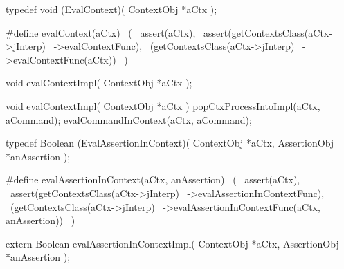\startCHeader
typedef void (EvalContext)(
  ContextObj *aCtx
);

#define evalContext(aCtx)                   \
  (                                         \
    assert(aCtx),                           \
    assert(getContextsClass(aCtx->jInterp)  \
      ->evalContextFunc),                   \
    (getContextsClass(aCtx->jInterp)        \
      ->evalContextFunc(aCtx))              \
  )
\stopCHeader

\setCHeaderStream{private}
\startCHeader
void evalContextImpl(
  ContextObj *aCtx
);
\stopCHeader
{}

\startCCode
void evalContextImpl(
  ContextObj *aCtx
) {
  popCtxProcessIntoImpl(aCtx, aCommand);
  evalCommandInContext(aCtx, aCommand);
}
\stopCCode

\startCHeader
typedef Boolean (EvalAssertionInContext)(
  ContextObj   *aCtx,
  AssertionObj *anAssertion
);

#define evalAssertionInContext(aCtx, anAssertion)       \
  (                                                     \
    assert(aCtx),                                       \
    assert(getContextsClass(aCtx->jInterp)              \
      ->evalAssertionInContextFunc),                    \
    (getContextsClass(aCtx->jInterp)                    \
      ->evalAssertionInContextFunc(aCtx, anAssertion))  \
  )
\stopCHeader

\startCHeader
extern Boolean evalAssertionInContextImpl(
  ContextObj   *aCtx,
  AssertionObj *anAssertion
);
\stopCHeader
\setCHeaderStream{public}

